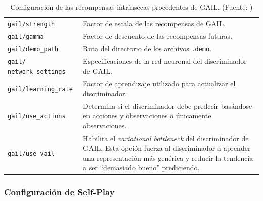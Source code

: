 \begin{table}[H]
\centering
    \begin{tabular}{|>{\rowmac}p{3.5cm}|>{\rowmac}p{10cm}<{\clearrow}|} 
        \hline
        \multicolumn{1}{|c|}{\textbf{Ajuste}} & \multicolumn{1}{c|}{\textbf{Descripción}} \\ \hline \hline
        \texttt{gail/strength} & Factor de escala de las recompensas de GAIL. \\
        \hline
        \texttt{gail/gamma} & Factor de descuento de las recompensas futuras. \\
        \hline
        \texttt{gail/demo\_path} & Ruta del directorio de los archivos \texttt{.demo}. \\
        \hline
        \texttt{gail/ network\_settings} & Especificaciones de la red neuronal del discriminador de GAIL. \\
        \hline
        \texttt{gail/learning\_rate} & Factor de aprendizaje utilizado para actualizar el discriminador. \\
        \hline
        \texttt{gail/use\_actions} & Determina si el discriminador debe predecir basándose en acciones y observaciones o únicamente observaciones. \\
        \hline
        \texttt{gail/use\_vail} & Habilita el \emph{variational bottleneck} del discriminador de GAIL. Esta opción fuerza al discriminador a aprender una representación más genérica y reducir la tendencia a ser ``demasiado bueno'' prediciendo.  \\
        \hline
    \end{tabular}
    \caption[Configuración de las recompensas intrínsecas procedentes de GAIL]{Configuración de las recompensas intrínsecas procedentes de GAIL. (Fuente: \cite{ml-agents-config-file})}
    \label{tab:config-gail}
\end{table}

\subsubsection{Configuración de Self-Play}

